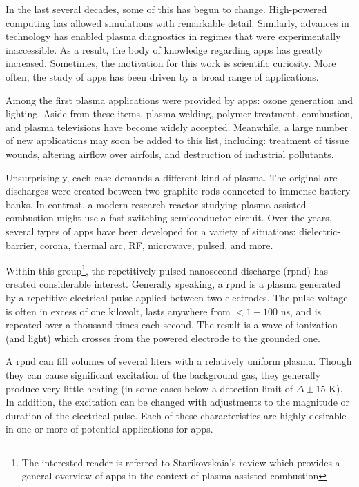 In the last several decades, some of this has begun to change. High-powered
computing has allowed simulations with remarkable detail. Similarly, advances in
technology has enabled plasma diagnostics in regimes that were experimentally
inaccessible. As a result, the body of knowledge regarding \acs{app}s has
greatly increased. Sometimes, the motivation for this work is scientific
curiosity. More often, the study of \acs{app}s has been driven by a broad range
of applications.

Among the first plasma applications were provided by \acs{app}s: ozone
generation and lighting. Aside from these items, plasma welding, polymer
treatment, combustion, and plasma televisions have become widely accepted.
Meanwhile, a large number of new applications may soon be added to this list,
including: treatment of tissue wounds, altering airflow over airfoils, and
destruction of industrial pollutants.

Unsurprisingly, each case demands a different kind of plasma. The original arc
discharges were created between two graphite rods connected to immense battery
banks. In contrast, a modern research reactor studying plasma-assisted
combustion might use a fast-switching semiconductor circuit. Over the years,
several types of \acs{app}s have been developed for a variety of situations:
dielectric-barrier, corona, thermal arc, RF, microwave, pulsed, and more.

Within this group\footnote{The interested reader is referred to Starikovskaia's
review \cite{Starikovskaia2006} which provides a general overview of \acs{app}s
in the context of plasma-assisted combustion}, the repetitively-pulsed
nanosecond discharge (\acs{rpnd}) has created considerable interest. Generally
speaking, a \acs{rpnd} is a plasma generated by a repetitive electrical pulse
applied between two electrodes. The pulse voltage is often in excess of one
kilovolt, lasts anywhere from $<1-100$ ns, and is repeated over a thousand
times each second. The result is a wave of ionization (and light) which crosses
from the powered electrode to the grounded one.

A \acs{rpnd} can fill volumes of several liters with a relatively uniform
plasma. Though they can cause significant excitation of the background gas, they
generally produce very little heating (in some cases below a detection limit of
$\Delta \pm 15$ K). In addition, the excitation can be changed with adjustments
to the magnitude or duration of the electrical pulse. Each of these
characteristics are highly desirable in one or more of potential applications
for \acs{app}s.

